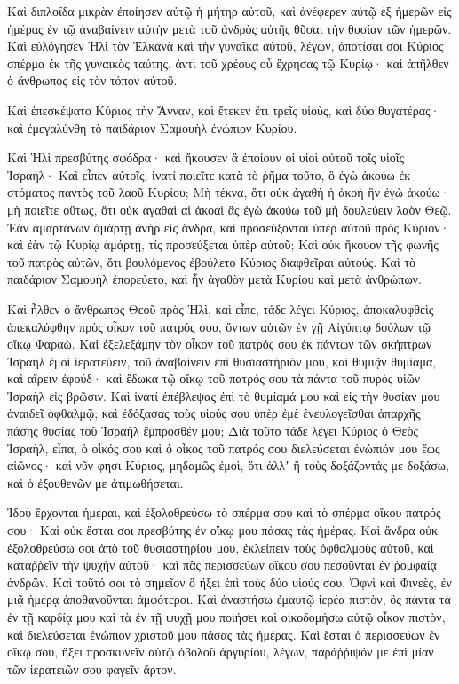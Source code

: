 {Καὶ διπλοΐδα μικρὰν ἐποίησεν αὐτῷ ἡ μήτηρ αὐτοῦ, καὶ ἀνέφερεν αὐτῷ ἐξ ἡμερῶν εἰς ἡμέρας ἐν τῷ ἀναβαίνειν αὐτὴν μετὰ τοῦ ἀνδρὸς αὐτῆς θῦσαι τὴν θυσίαν τῶν ἡμερῶν.
Καὶ εὐλόγησεν Ἡλὶ τὸν Ἑλκανὰ καὶ τὴν γυναῖκα αὐτοῦ, λέγων, ἀποτίσαι σοι Κύριος σπέρμα ἐκ τῆς γυναικὸς ταύτης, ἀντὶ τοῦ χρέους οὗ ἔχρησας τῷ Κυρίῳ· καὶ ἀπῆλθεν ὁ ἄνθρωπος εἰς τὸν τόπον αὐτοῦ.
\par }{\PP {}Καὶ ἐπεσκέψατο Κύριος τὴν Ἄνναν, καὶ ἔτεκεν ἔτι τρεῖς υἱοὺς, καὶ δύο θυγατέρας· καὶ ἐμεγαλύνθη τὸ παιδάριον Σαμουὴλ ἐνώπιον Κυρίου.
\par }{\PP {}Καὶ Ἡλὶ πρεσβύτης σφόδρα· καὶ ἤκουσεν ἃ ἐποίουν οἱ υἱοὶ αὐτοῦ τοῖς υἱοῖς Ἰσραήλ·
Καὶ εἶπεν αὐτοῖς, ἱνατί ποιεῖτε κατὰ τὸ ῥῆμα τοῦτο, ὃ ἐγὼ ἀκούω ἐκ στόματος παντὸς τοῦ λαοῦ Κυρίου;
Μὴ τέκνα, ὅτι οὐκ ἀγαθὴ ἡ ἀκοὴ ἣν ἐγὼ ἀκούω· μὴ ποιεῖτε οὕτως, ὅτι οὐκ ἀγαθαὶ αἱ ἀκοαὶ ἃς ἐγὼ ἀκούω τοῦ μὴ δουλεύειν λαὸν Θεῷ.
Ἐὰν ἁμαρτάνων ἁμάρτῃ ἀνὴρ εἰς ἄνδρα, καὶ προσεύξονται ὑπὲρ αὐτοῦ πρὸς Κύριον· καὶ ἐὰν τῷ Κυρίῳ ἁμάρτῃ, τίς προσεύξεται ὑπὲρ αὐτοῦ; Καὶ οὐκ ἤκουον τῆς φωνῆς τοῦ πατρὸς αὐτῶν, ὅτι βουλόμενος ἐβούλετο Κύριος διαφθεῖραι αὐτούς.
Καὶ τὸ παιδάριον Σαμουὴλ ἐπορεύετο, καὶ ἦν ἀγαθὸν μετὰ Κυρίου καὶ μετὰ ἀνθρώπων.
\par }{\PP {}Καὶ ἦλθεν ὁ ἄνθρωπος Θεοῦ πρὸς Ἡλὶ, καὶ εἶπε, τάδε λέγει Κύριος, ἀποκαλυφθεὶς ἀπεκαλύφθην πρὸς οἶκον τοῦ πατρός σου, ὄντων αὐτῶν ἐν γῇ Αἰγύπτῳ δούλων τῷ οἴκῳ Φαραὼ.
Καὶ ἐξελεξάμην τὸν οἶκον τοῦ πατρός σου ἐκ πάντων τῶν σκήπτρων Ἰσραὴλ ἐμοὶ ἱερατεύειν, τοῦ ἀναβαίνειν ἐπὶ θυσιαστήριόν μου, καὶ θυμιᾷν θυμίαμα, καὶ αἴρειν ἐφούδ· καὶ ἔδωκα τῷ οἴκῳ τοῦ πατρός σου τὰ πάντα τοῦ πυρὸς υἱῶν Ἰσραὴλ εἰς βρῶσιν.
Καὶ ἱνατί ἐπέβλεψας ἐπὶ τὸ θυμίαμά μου καὶ εἰς τὴν θυσίαν μου ἀναιδεῖ ὀφθαλμῷ; καὶ ἐδόξασας τοὺς υἱούς σου ὑπὲρ ἐμὲ ἐνευλογεῖσθαι ἀπαρχῆς πάσης θυσίας τοῦ Ἰσραὴλ ἔμπροσθέν μου;
Διὰ τοῦτο τάδε λέγει Κύριος ὁ Θεὸς Ἰσραὴλ, εἶπα, ὁ οἶκός σου καὶ ὁ οἶκος τοῦ πατρός σου διελεύσεται ἐνώπιόν μου ἕως αἰῶνος· καὶ νῦν φησι Κύριος, μηδαμῶς ἐμοὶ, ὅτι ἀλλʼ ἢ τοὺς δοξάζοντάς με δοξάσω, καὶ ὁ ἐξουθενῶν με ἀτιμωθήσεται.
\par }{\PP {}Ἰδοὺ ἔρχονται ἡμέραι, καὶ ἐξολοθρεύσω τὸ σπέρμα σου καὶ τὸ σπέρμα οἴκου πατρός σου·
Καὶ οὐκ ἔσται σοι πρεσβύτης ἐν οἴκῳ μου πάσας τὰς ἡμέρας.
Καὶ ἄνδρα οὐκ ἐξολοθρεύσω σοι ἀπὸ τοῦ θυσιαστηρίου μου, ἐκλείπειν τοὺς ὀφθαλμοὺς αὐτοῦ, καὶ καταῤῥεῖν τὴν ψυχὴν αὐτοῦ· καὶ πᾶς περισσεύων οἴκου σου πεσοῦνται ἐν ῥομφαίᾳ ἀνδρῶν.
Καὶ τοῦτό σοι τὸ σημεῖον ὃ ἥξει ἐπὶ τοὺς δύο υἱούς σου, Ὀφνὶ καὶ Φινεὲς, ἐν μιᾷ ἡμέρᾳ ἀποθανοῦνται ἀμφότεροι.
Καὶ ἀναστήσω ἐμαυτῷ ἱερέα πιστὸν, ὃς πάντα τὰ ἐν τῇ καρδίᾳ μου καὶ τὰ ἐν τῇ ψυχῇ μου ποιήσει καὶ οἰκοδομήσω αὐτῷ οἶκον πιστὸν, καὶ διελεύσεται ἐνώπιον χριστοῦ μου πάσας τὰς ἡμέρας.
Καὶ ἔσται ὁ περισσεύων ἐν οἴκῳ σου, ἥξει προσκυνεῖν αὐτῷ ὀβολοῦ ἀργυρίου, λέγων, παράῤῥιψόν με ἐπὶ μίαν τῶν ἱερατειῶν σου φαγεῖν ἄρτον.

}
